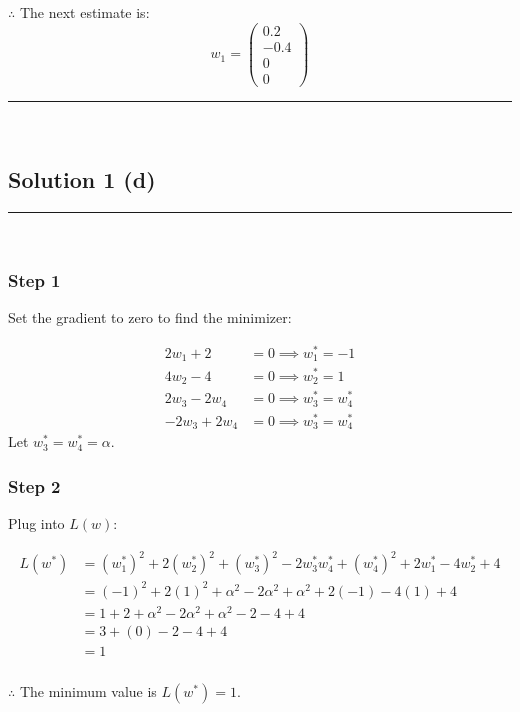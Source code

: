 \documentclass{article}
\begin{document}
\subsubsection*{\normalfont}{$\therefore$ The next estimate is:}
$$
w_1 = 
\begin{pmatrix}
0.2 \\
-0.4 \\
0 \\
0
\end{pmatrix}$$

\noindent\rule{\textwidth}{0.4pt}\\

\newpage

\subsection*{Solution 1 (d)}
\noindent\rule{\textwidth}{0.4pt}\\

\subsubsection*{Step 1}
\parbox{\textwidth}{
Set the gradient to zero to find the minimizer:
}
\[
\begin{aligned}
2w_1 + 2 &= 0 \implies w_1^* = -1 \\
4w_2 - 4 &= 0 \implies w_2^* = 1 \\
2w_3 - 2w_4 &= 0 \implies w_3^* = w_4^* \\
-2w_3 + 2w_4 &= 0 \implies w_3^* = w_4^*
\end{aligned}
\]
Let $w_3^* = w_4^* = \alpha$.

\subsubsection*{Step 2}
\parbox{\textwidth}{
Plug into $L(w)$:
}
\[
\begin{aligned}
L(w^*) &= (w_1^*)^2 + 2(w_2^*)^2 + (w_3^*)^2 - 2w_3^*w_4^* + (w_4^*)^2 + 2w_1^* - 4w_2^* + 4 \\
&= (-1)^2 + 2(1)^2 + \alpha^2 - 2\alpha^2 + \alpha^2 + 2(-1) - 4(1) + 4 \\
&= 1 + 2 + \alpha^2 - 2\alpha^2 + \alpha^2 - 2 - 4 + 4 \\
&= 3 + (0) - 2 - 4 + 4 \\
&= 1
\end{aligned}
\]

\subsubsection*{\normalfont}{$\therefore$ The minimum value is $L(w^*) = 1$.}
\end{document}
